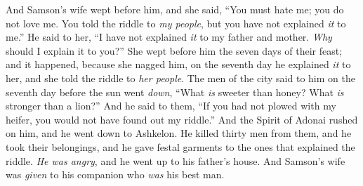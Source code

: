 \begin{biblechapter}
\verse And Samson’s wife wept before him, and she said, “You must hate me; you do not love me. You told the riddle to \textit{my people}, but you have not explained \textit{it} to me.” He said to her, “I have not explained \textit{it} to my father and mother. \textit{Why} should I explain it to you?”
\verse She wept before him the seven days of their feast; and it happened, because she nagged him, on the seventh day he explained \textit{it} to her, and she told the riddle to \textit{her people}.
\verse The men of the city said to him on the seventh day before the sun went \textit{down}, “What \textit{is} sweeter than honey? 
What \textit{is} stronger than a lion?” And he said to them, “If you had not plowed with my heifer, 
you would not have found out my riddle.”
\verse And the Spirit of Adonai rushed on him, and he went down to Ashkelon. He killed thirty men from them, and he took their belongings, and he gave festal garments to the ones that explained the riddle. \textit{He was angry}, and he went up to his father’s house.
\verse And Samson’s wife was \textit{given} to his companion who \textit{was} his best man.
\end{biblechapter}

